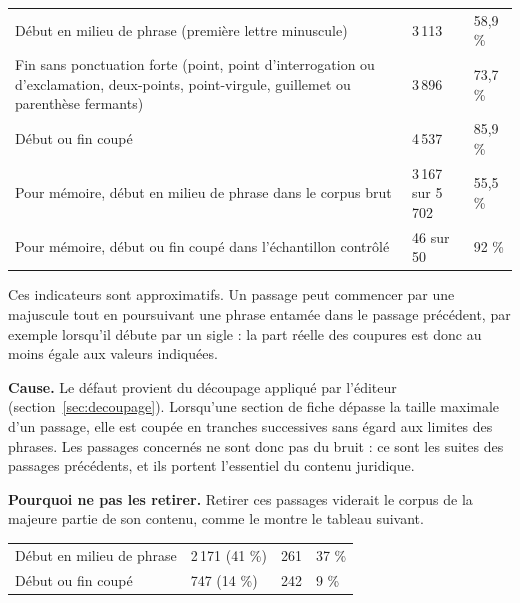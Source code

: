 \begin{tabletype}
\begin{tabularx}{\textwidth}{@{}Y L{2.6cm}L{2.2cm}@{}}
\toprule
{} &  &  \\
\midrule
Début en milieu de phrase (première lettre minuscule) & 3\,113 & 58,9 \% \\
Fin sans ponctuation forte (point, point d'interrogation ou d'exclamation, deux-points, point-virgule, guillemet ou parenthèse fermants) & 3\,896 & 73,7 \% \\
Début ou fin coupé & 4\,537 & 85,9 \% \\
\midrule
Pour mémoire, début en milieu de phrase dans le corpus brut & 3\,167 sur 5\,702 & 55,5 \% \\
Pour mémoire, début ou fin coupé dans l'échantillon contrôlé & 46 sur 50 & 92 \% \\
\bottomrule
\end{tabularx}
\end{tabletype}

Ces indicateurs sont approximatifs. Un passage peut commencer par une majuscule tout en poursuivant une
phrase entamée dans le passage précédent, par exemple lorsqu'il débute par un sigle : la part réelle des
coupures est donc au moins égale aux valeurs indiquées.

\textbf{Cause.} Le défaut provient du découpage appliqué par l'éditeur (section~\ref{sec:decoupage}). Lorsqu'une
section de fiche dépasse la taille maximale d'un passage, elle est coupée en tranches successives sans
égard aux limites des phrases. Les passages concernés ne sont donc pas du bruit : ce sont les suites des
passages précédents, et ils portent l'essentiel du contenu juridique.

\textbf{Pourquoi ne pas les retirer.} Retirer ces passages viderait le corpus de la majeure partie de son
contenu, comme le montre le tableau suivant.

\begin{tabletype}
\begin{tabularx}{\textwidth}{@{}Y L{2.6cm}L{2.2cm}L{2.4cm}@{}}
\toprule
{} &  &  &  \\
\midrule
Début en milieu de phrase & 2\,171 (41 \%) & 261 & 37 \% \\
Début ou fin coupé & 747 (14 \%) & 242 & 9 \% \\
\bottomrule
\end{tabularx}
\end{tabletype}

